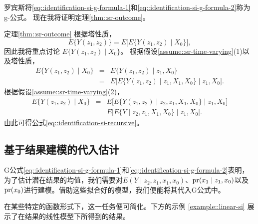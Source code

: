 罗宾斯将\eqref{eq::identification-si-g-formula-1}和\eqref{eq::identification-si-g-formula-2}称为g-公式。  
现在我将证明定理\ref{thm::sr-outcome}。 
 

\begin{myproof}{定理}{\ref{thm::sr-outcome}}
根据塔性质，
$$
E\{ Y(z_1, z_2) \}  = E \Big[  E\{ Y(z_1, z_2) \mid X_0 \}  \Big ],
$$
因此我将重点讨论 $E\{ Y(z_1, z_2) \mid X_0 \}$。  
根据假设\ref{assume::sr-time-varying}(1)以及塔性质，
\begin{eqnarray*}
E\{ Y(z_1, z_2) \mid X_0 \} &=& E\{ Y(z_1, z_2) \mid  z_1, X_0 \} \\
&=& E\Big [ E\{ Y(z_1, z_2) \mid   z_1, X_1, X_0 \} \mid   z_1, X_0  \Big].
\end{eqnarray*}
根据假设\ref{assume::sr-time-varying}(2)，
\begin{eqnarray*}
E\{ Y(z_1, z_2) \mid X_0 \}  
&=& E\Big [ E\{ Y(z_1, z_2) \mid z_2,   z_1,X_1, X_0 \} \mid  z_1, X_0  \Big] \\
&=& E\Big [ E\{ Y \mid z_2, z_1, X_1, X_0 \} \mid   z_1, X_0  \Big] .
\end{eqnarray*}
由此可得公式\eqref{eq::identification-si-recursive}。 
\end{myproof}



\subsection{基于结果建模的代入估计}
\label{section::si-plug-in-outcome}

G公式\eqref{eq::identification-si-g-formula-1}和\eqref{eq::identification-si-g-formula-2}表明，为了估计潜在结果的均值，我们需要对$E(Y\mid z_2,z_1, x_1, x_0)$、$\textup{pr}(x_1\mid z_1,x_0)$以及$\textup{pr}(x_0)$进行建模。借助这些拟合好的模型，我们便能将其代入G公式中。 

在某些特定的函数形式下，这一任务便可简化。下方的示例 \ref{example::linear-si} 展示了在结果的线性模型下所得到的结果。 


